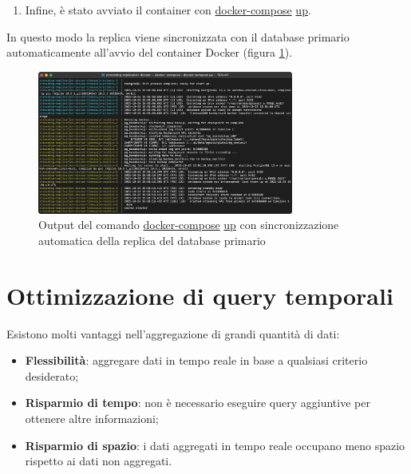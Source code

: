 \begin{enumerate}
\begin{lstlisting}[]
        # Parametri di replicazione
        REPLICA_USER: repuser # Utente di replicazione impostato al punto 1
        REPLICATION_HOST: x.x.x.x # IP del db primario
        REPLICATION_PORT: x # Porta del db primario
        REPLICATION_PASSWORD: SOME_SECURE_PASSWORD # Password di replicazione impostata al punto 1
    ports:
        - 45432:5432
    volumes:
        - /var/replica-pg13-timescale/:/var/lib/postgresql/data
\end{lstlisting}
Questo file semplicemente costruisce il container leggendo le istruzioni dal \url{Dockerfile} del passo 1, e applicando le varabili di ambiente specificate nel campo \url{environment}. Ulteriori parametri possono essere specificati, come ad esempio la porta sulla quale viene esposto il database (campo \url{ports}) e la cartella dell'host che viene mappata come volume di dati nel container (campo \url{volumes});
  \item Infine, è stato avviato il container con \url{docker-compose} \url{up}.
\end{enumerate}

In questo modo la replica viene sincronizzata con il database primario automaticamente all'avvio del container Docker (figura \ref{fig:replication}).

\begin{figure}[H]
\centering
\captionsetup{justification=centering}
\includegraphics[width=0.75\textwidth,height=\textheight,keepaspectratio]{img/replication}

\caption{Output del comando \url{docker-compose} \url{up} con sincronizzazione automatica della replica del database primario}
\label{fig:replication}
\end{figure}

\section{Ottimizzazione di query temporali}\label{sec:cont-aggr}
Esistono molti vantaggi nell'aggregazione di grandi quantità di dati:
\begin{itemize}
  \item \textbf{Flessibilità}: aggregare dati in tempo reale in base a qualsiasi criterio desiderato;
  \item \textbf{Risparmio di tempo}: non è necessario eseguire query aggiuntive per ottenere altre informazioni;
  \item \textbf{Risparmio di spazio}: i dati aggregati in tempo reale occupano meno spazio rispetto ai dati non aggregati.
\end{itemize}

